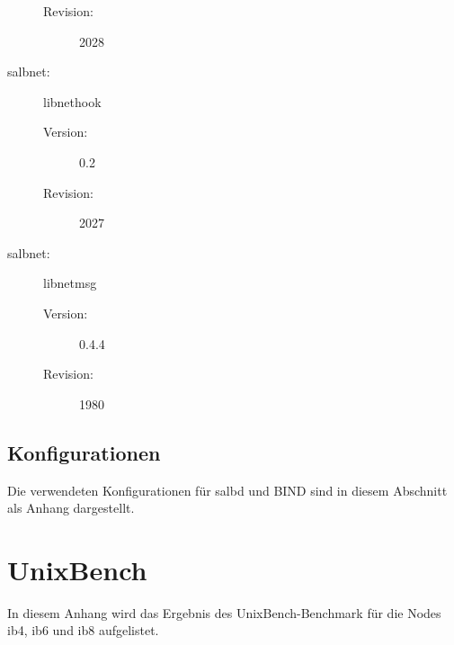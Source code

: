 \documentclass[a4paper, 12pt, BCOR10mm, DIV12, toc=bibliography, toc=listof, german]{scrbook}
\begin{document}
\begin{description}
\begin{description}
					\item[Revision:] 2028
				\end{description}
			\item[salbnet:] libnethook
				\begin{description}
					\item[Version:] 0.2
					\item[Revision:] 2027
				\end{description}
			\item[salbnet:] libnetmsg
				\begin{description}
					\item[Version:] 0.4.4
					\item[Revision:] 1980
				\end{description}
		\end{description}


		\section{Konfigurationen} %
		\label{sec:konfigurationen}

			Die verwendeten Konfigurationen für salbd und BIND sind in diesem Abschnitt als Anhang
			dargestellt.

			

		

		

		



	\chapter{UnixBench} %
	\label{cha:unixbench}

			In diesem Anhang wird das Ergebnis des UnixBench-Benchmark für die Nodes ib4, ib6 und
			ib8 aufgelistet.
\end{document}
